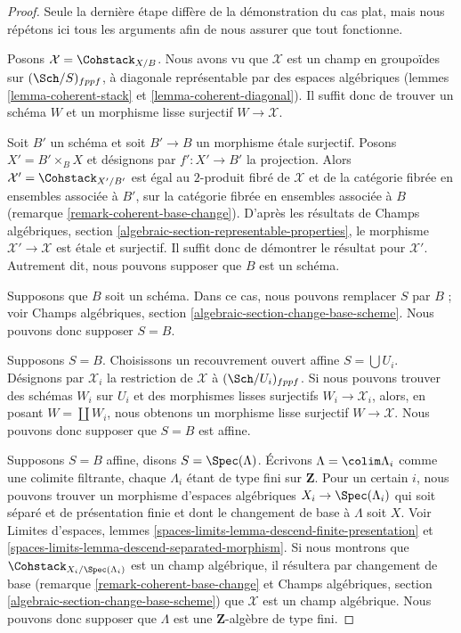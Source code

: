 \begin{proof}
Seule la dernière étape diffère de la démonstration du cas plat, mais nous
répétons ici tous les arguments afin de nous assurer que tout fonctionne.

\medskip\noindent
Posons $\mathcal{X} = \Cohstack_{X/B}$. Nous avons vu que $\mathcal{X}$ est un
champ en groupoïdes sur $(\Sch/S)_{fppf}$, à diagonale représentable par des
espaces algébriques (lemmes \ref{lemma-coherent-stack} et
\ref{lemma-coherent-diagonal}). Il suffit donc de trouver un schéma $W$ et un
morphisme lisse surjectif $W \to \mathcal{X}$.

\medskip\noindent
Soit $B'$ un schéma et soit $B' \to B$ un morphisme étale surjectif. Posons
$X' = B' \times_B X$ et désignons par $f' : X' \to B'$ la projection. Alors
$\mathcal{X}' = \Cohstack_{X'/B'}$ est égal au $2$-produit fibré de
$\mathcal{X}$ et de la catégorie fibrée en ensembles associée à $B'$, sur la
catégorie fibrée en ensembles associée à $B$ (remarque
\ref{remark-coherent-base-change}). D'après les résultats de Champs
algébriques, section \ref{algebraic-section-representable-properties}, le
morphisme $\mathcal{X}' \to \mathcal{X}$ est étale et surjectif. Il suffit donc
de démontrer le résultat pour $\mathcal{X}'$. Autrement dit, nous pouvons
supposer que $B$ est un schéma.

\medskip\noindent
Supposons que $B$ soit un schéma. Dans ce cas, nous pouvons remplacer $S$ par
$B$ ; voir Champs algébriques, section
\ref{algebraic-section-change-base-scheme}. Nous pouvons donc supposer
$S = B$.

\medskip\noindent
Supposons $S = B$. Choisissons un recouvrement ouvert affine
$S = \bigcup U_i$. Désignons par $\mathcal{X}_i$ la restriction de
$\mathcal{X}$ à $(\Sch/U_i)_{fppf}$. Si nous pouvons trouver des schémas $W_i$
sur $U_i$ et des morphismes lisses surjectifs
$W_i \to \mathcal{X}_i$, alors, en posant $W = \coprod W_i$, nous obtenons un
morphisme lisse surjectif $W \to \mathcal{X}$. Nous pouvons donc supposer que
$S = B$ est affine.

\medskip\noindent
Supposons $S = B$ affine, disons $S = \Spec(\Lambda)$. Écrivons
$\Lambda = \colim \Lambda_i$ comme une colimite filtrante, chaque $\Lambda_i$
étant de type fini sur $\mathbf{Z}$. Pour un certain $i$, nous pouvons trouver
un morphisme d'espaces algébriques $X_i \to \Spec(\Lambda_i)$ qui soit séparé
et de présentation finie et dont le changement de base à $\Lambda$ soit $X$.
Voir Limites d'espaces, lemmes
\ref{spaces-limits-lemma-descend-finite-presentation} et
\ref{spaces-limits-lemma-descend-separated-morphism}. Si nous montrons que
$\Cohstack_{X_i/\Spec(\Lambda_i)}$ est un champ algébrique, il résultera par
changement de base (remarque \ref{remark-coherent-base-change} et Champs
algébriques, section \ref{algebraic-section-change-base-scheme}) que
$\mathcal{X}$ est un champ algébrique. Nous pouvons donc supposer que
$\Lambda$ est une $\mathbf{Z}$-algèbre de type fini.


\end{proof}
